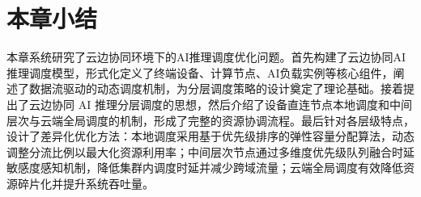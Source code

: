 \section{本章小结}

本章系统研究了云边协同环境下的AI推理调度优化问题。首先构建了云边协同AI推理调度模型，形式化定义了终端设备、计算节点、AI负载实例等核心组件，阐述了数据流驱动的动态调度机制，为分层调度策略的设计奠定了理论基础。接着提出了云边协同 AI 推理分层调度的思想，然后介绍了设备直连节点本地调度和中间层次与云端全局调度的机制，形成了完整的资源协调流程。最后针对各层级特点，设计了差异化优化方法：本地调度采用基于优先级排序的弹性容量分配算法，动态调整分流比例以最大化资源利用率；中间层次节点通过多维度优先级队列融合时延敏感度感知机制，降低集群内调度时延并减少跨域流量；云端全局调度有效降低资源碎片化并提升系统吞吐量。
